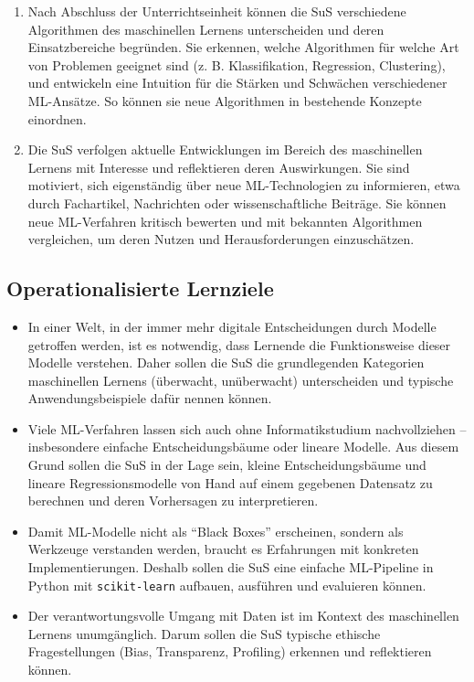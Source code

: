 \documentclass[twocolumn]{article}
\begin{document}
\begin{enumerate}

    \item Nach Abschluss der Unterrichtseinheit können die SuS verschiedene Algorithmen des maschinellen Lernens unterscheiden und deren Einsatzbereiche begründen. Sie erkennen, welche Algorithmen für welche Art von Problemen geeignet sind (z. B. Klassifikation, Regression, Clustering), und entwickeln eine Intuition für die Stärken und Schwächen verschiedener ML-Ansätze. So können sie neue Algorithmen in bestehende Konzepte einordnen.

    \item Die SuS verfolgen aktuelle Entwicklungen im Bereich des maschinellen Lernens mit Interesse und reflektieren deren Auswirkungen. Sie sind motiviert, sich eigenständig über neue ML-Technologien zu informieren, etwa durch Fachartikel, Nachrichten oder wissenschaftliche Beiträge.
    Sie können neue ML-Verfahren kritisch bewerten und mit bekannten Algorithmen vergleichen, um deren Nutzen und Herausforderungen einzuschätzen.

\end{enumerate}

\subsection{Operationalisierte Lernziele}


\begin{itemize}
  \item
  In einer Welt, in der immer mehr digitale Entscheidungen durch Modelle getroffen werden, ist es notwendig, dass Lernende die Funktionsweise dieser Modelle verstehen. 
  Daher sollen die SuS die grundlegenden Kategorien maschinellen Lernens (überwacht, unüberwacht) unterscheiden und typische Anwendungsbeispiele dafür nennen können.

  \item
  Viele ML-Verfahren lassen sich auch ohne Informatikstudium nachvollziehen – insbesondere einfache Entscheidungsbäume oder lineare Modelle. 
  Aus diesem Grund sollen die SuS in der Lage sein, kleine Entscheidungsbäume und lineare Regressionsmodelle von Hand auf einem gegebenen Datensatz zu berechnen und deren Vorhersagen zu interpretieren.

  \item
  Damit ML-Modelle nicht als ``Black Boxes'' erscheinen, sondern als Werkzeuge verstanden werden, braucht es Erfahrungen mit konkreten Implementierungen. 
  Deshalb sollen die SuS eine einfache ML-Pipeline in Python mit \texttt{scikit-learn} aufbauen, ausführen und evaluieren können.

  \item
  Der verantwortungsvolle Umgang mit Daten ist im Kontext des maschinellen Lernens unumgänglich. 
  Darum sollen die SuS typische ethische Fragestellungen (Bias, Transparenz, Profiling) erkennen und reflektieren können.
\end{itemize}
\end{document}
